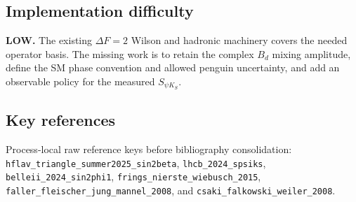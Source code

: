 \subsection*{Implementation difficulty}
\textbf{LOW.}  The existing \(\Delta F=2\) Wilson and hadronic machinery covers the
needed operator basis.  The missing work is to retain the complex \(B_d\)
mixing amplitude, define the SM phase convention and allowed penguin
uncertainty, and add an observable policy for the measured \(S_{\psi K_S}\).

\subsection*{Key references}
Process-local raw reference keys before bibliography consolidation:
\texttt{hflav\_triangle\_summer2025\_sin2beta},
\texttt{lhcb\_2024\_spsiks},
\texttt{belleii\_2024\_sin2phi1},
\texttt{frings\_nierste\_wiebusch\_2015},
\texttt{faller\_fleischer\_jung\_mannel\_2008}, and
\texttt{csaki\_falkowski\_weiler\_2008}.
